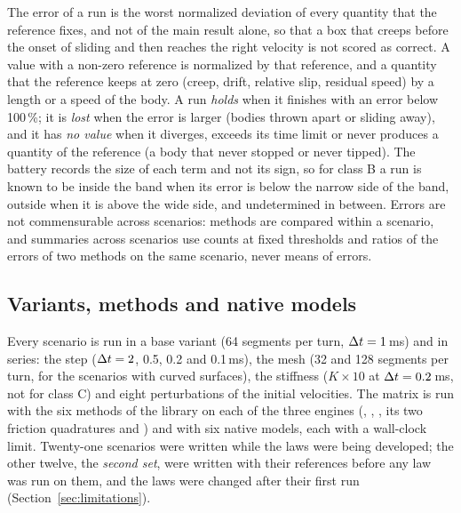The error of a run is the worst normalized deviation of every quantity that the reference
fixes, and not of the main result alone, so that a box that creeps before the onset of sliding
and then reaches the right velocity is not scored as correct. A value with a non-zero reference
is normalized by that reference, and a quantity that the reference keeps at zero (creep, drift,
relative slip, residual speed) by a length or a speed of the body. A run \emph{holds} when it
finishes with an error below 100\,\%; it is \emph{lost} when the error is larger (bodies thrown
apart or sliding away), and it has \emph{no value} when it diverges, exceeds its time limit or
never produces a quantity of the reference (a body that never stopped or never tipped). The
battery records the size of each term and not its sign, so for class B a run is known to be
inside the band when its error is below the narrow side of the band, outside when it is above
the wide side, and undetermined in between. Errors are not commensurable across scenarios:
methods are compared within a scenario, and summaries across scenarios use counts at fixed
thresholds and ratios of the errors of two methods on the same scenario, never means of errors.

\subsection{Variants, methods and native models}\label{sec:variants}\label{sec:natives}

Every scenario is run in a base variant (64 segments per turn, $\Delta t = 1$\,ms) and in series:
the step ($\Delta t = 2$, 0.5, 0.2 and 0.1\,ms), the mesh (32 and 128 segments per turn, for the
scenarios with curved surfaces), the stiffness ($K\times10$ at $\Delta t = 0.2$\,ms, not for class
C) and eight perturbations of the initial velocities. The matrix is run with the six methods of
the library on each of the three engines (, ,
, its two friction quadratures and ) and with six native models, each
with a wall-clock limit. Twenty-one scenarios were written while the laws were being developed;
the other twelve, the \emph{second set}, were written with their references before any law was
run on them, and the laws were changed after their first run (Section~\ref{sec:limitations}).


